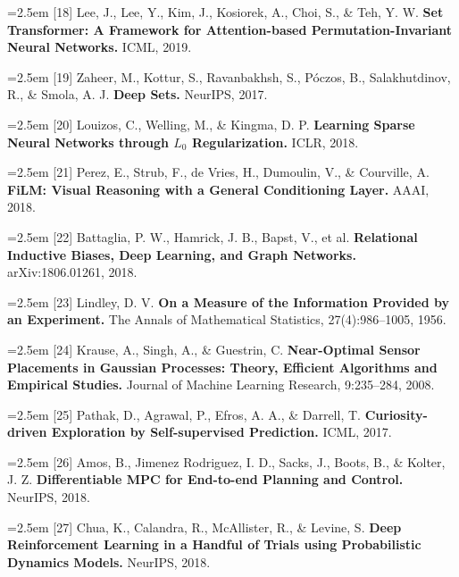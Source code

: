 \documentclass[11pt]{article}
\begin{document}
\noindent\hangindent=2.5em [18] Lee, J., Lee, Y., Kim, J., Kosiorek, A., Choi, S., \& Teh, Y. W. \textbf{Set Transformer: A Framework for Attention-based Permutation-Invariant Neural Networks.} ICML, 2019.\par

\noindent\hangindent=2.5em [19] Zaheer, M., Kottur, S., Ravanbakhsh, S., P\'oczos, B., Salakhutdinov, R., \& Smola, A. J. \textbf{Deep Sets.} NeurIPS, 2017.\par

\noindent\hangindent=2.5em [20] Louizos, C., Welling, M., \& Kingma, D. P. \textbf{Learning Sparse Neural Networks through $L_0$ Regularization.} ICLR, 2018.\par

\noindent\hangindent=2.5em [21] Perez, E., Strub, F., de Vries, H., Dumoulin, V., \& Courville, A. \textbf{FiLM: Visual Reasoning with a General Conditioning Layer.} AAAI, 2018.\par

\noindent\hangindent=2.5em [22] Battaglia, P. W., Hamrick, J. B., Bapst, V., et al. \textbf{Relational Inductive Biases, Deep Learning, and Graph Networks.} arXiv:1806.01261, 2018.\par

\noindent\hangindent=2.5em [23] Lindley, D. V. \textbf{On a Measure of the Information Provided by an Experiment.} The Annals of Mathematical Statistics, 27(4):986--1005, 1956.\par

\noindent\hangindent=2.5em [24] Krause, A., Singh, A., \& Guestrin, C. \textbf{Near-Optimal Sensor Placements in Gaussian Processes: Theory, Efficient Algorithms and Empirical Studies.} Journal of Machine Learning Research, 9:235--284, 2008.\par

\noindent\hangindent=2.5em [25] Pathak, D., Agrawal, P., Efros, A. A., \& Darrell, T. \textbf{Curiosity-driven Exploration by Self-supervised Prediction.} ICML, 2017.\par

\noindent\hangindent=2.5em [26] Amos, B., Jimenez Rodriguez, I. D., Sacks, J., Boots, B., \& Kolter, J. Z. \textbf{Differentiable MPC for End-to-end Planning and Control.} NeurIPS, 2018.\par

\noindent\hangindent=2.5em [27] Chua, K., Calandra, R., McAllister, R., \& Levine, S. \textbf{Deep Reinforcement Learning in a Handful of Trials using Probabilistic Dynamics Models.} NeurIPS, 2018.\par
\end{document}
